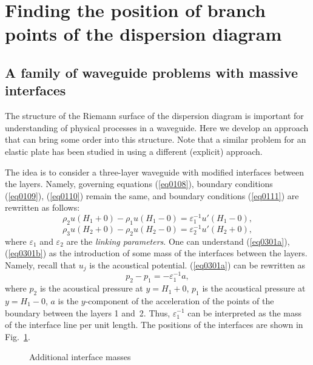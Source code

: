 \documentclass[12pt]{article}
\newcommand{\eps}{\varepsilon}
\begin{document}
\section{Finding the position of branch points of the dispersion diagram}
\label{sec_branchpoints}

\subsection{A family of waveguide problems with massive interfaces}


The structure of the Riemann surface of the dispersion diagram is important for understanding of physical processes in a waveguide.  
Here we develop an approach that can bring some order into this structure. Note that 
a similar problem for an elastic plate has been studied in \cite{Randles} using a different (explicit) approach. 

The idea is to consider a three-layer waveguide with modified interfaces between the layers.  
Namely, governing equations (\ref{eq0108}), 
boundary conditions (\ref{eq0109}), (\ref{eq0110}) remain the same, and boundary conditions 
(\ref{eq0111}) are rewritten as follows: 
\begin{equation}
\rho_2 u (H_1+0) - \rho_1 u (H_1-0) = \eps_1^{-1} u' (H_1 -0), 
\label{eq0301a}
\end{equation}
\begin{equation} 
\rho_3 u (H_2+0) - \rho_2 u (H_2-0) = \eps_2^{-1} u' (H_2+0), 
\label{eq0301b}
\end{equation}
where $\eps_1$ and $\eps_2$ are the {\em linking parameters}. 
One can understand (\ref{eq0301a}), (\ref{eq0301b})
as the introduction of some mass of the interfaces between the layers. 
Namely, recall that $u_j$ is the acoustical potential. 
(\ref{eq0301a}) can be rewritten as 
\[
p_2 - p_1 = -\eps_1^{-1} a,
\]
where $p_2$ is the acoustical pressure at $y = H_1 + 0$, $p_1$ is the acoustical 
pressure at $y = H_1 - 0$, $a$ is the $y$-component of the acceleration of the 
points of the boundary between the layers 1 and~2. Thus, $\eps_1^{-1}$ can 
be interpreted as the mass of the interface line per unit length. 
The positions of the interfaces are shown in Fig.~\ref{fig01a}. 

\begin{figure}[ht]
\centerline{}
\caption{Additional interface masses} 
\label{fig01a}
\end{figure}
\end{document}
